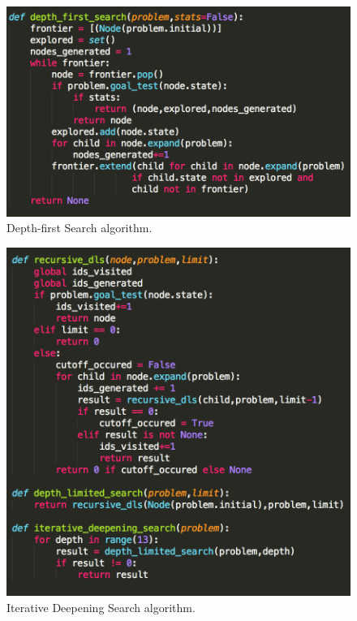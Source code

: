 \documentclass[12pt, letter]{article}
\begin{document}
\begin{figure}[htb]
  \centering
  \includegraphics[width=0.9 \textwidth]{./graphs/dfs.png}
  \caption{Depth-first Search algorithm.}
\end{figure}

\begin{figure}[htb]
  \centering
  \includegraphics[width=0.9 \textwidth]{./graphs/iterative_deepening.png}
  \caption{Iterative Deepening Search algorithm.}
\end{figure}

\FloatBarrier
\end{document}
